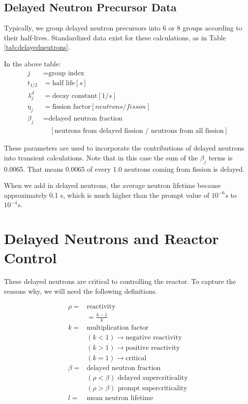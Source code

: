 \documentclass[12pt]{article}
\begin{document}
\subsection{Delayed Neutron Precursor Data}
Typically, we group delayed neutron precursors into 6 or 8 groups according to 
their half-lives. Standardized data exist for these calculations, as in Table 
\ref{tab:delayedneutrons}.



In the above table:
\begin{align*}
j &= \mbox{group index}\\
t_{1/2} &= \mbox{half life} [s]\\
\lambda_j^d &= \mbox{decay constant} [1/s]\\
\eta_j &= \mbox{fission factor} [neutrons/fisson]\\
\beta_j &= \mbox{delayed neutron fraction} \\&\quad[\text{neutrons from delayed fission / neutrons from all fission}]\nonumber
\end{align*}

These parameters are used to incorporate the contributions of delayed neutrons 
into transient calculations. Note that in this case the sum of the $\beta_{j}$ terms is 0.0065. That means 0.0065 of every 1.0 neutrons coming from fission is delayed.

When we add in delayed neutrons, the average neutron lifetime because approximately 0.1 s, which is much higher than the prompt value of $10^{-6}s$ to $10^{-4}s$.

\section{Delayed Neutrons and Reactor Control}
These delayed neutrons are critical to controlling the reactor. 
To capture the reasons why, we will need the following definitions.

\begin{align*}
\rho =& \mbox{reactivity}\\
&= \frac{k-1}{k}\\
k =& \mbox{multiplication factor}\\
&(k < 1) \rightarrow \mbox{negative reactivity}\\
&(k > 1) \rightarrow \mbox{positive reactivity}\\
&(k = 1) \rightarrow \mbox{critical}\\
\beta =& \mbox{delayed neutron fraction}\\
&(\rho < \beta) \mbox{ delayed supercriticality}\\
&(\rho > \beta) \mbox{ prompt supercriticality}\\
l =& \mbox{mean neutron lifetime}
\end{align*}
\end{document}

